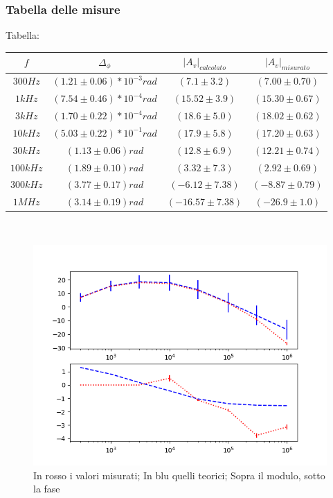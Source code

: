 \documentclass{article}
\begin{document}
\subsubsection{Tabella delle misure}
Tabella:
\\
\begin{table}[]
\centering
\label{my-label}
\renewcommand{\arraystretch}{1.5}
\begin{tabular}{|c|c|c|c|}
\hline $f$ & $\Delta_\phi$ & ${|A_v|}_{calcolato}$ & ${|A_v|}_{misurato}$
\\
\hline $300Hz$ & $(1.21 \pm 0.06)*10^{-3} rad$ & $(7.1 \pm 3.2) $ & $ (7.00 \pm 0.70) $\\
\hline $1kHz$ & $(7.54 \pm 0.46)*10^{-4} rad$ & $(15.52 \pm 3.9)$ & $ (15.30 \pm 0.67) $\\
\hline $3kHz$ & $(1.70 \pm 0.22)*10^{-4} rad$ & $(18.6 \pm 5.0)$ & $ (18.02 \pm 0.62) $\\
\hline $10kHz$ & $(5.03 \pm 0.22)*10^{-1} rad$ & $(17.9 \pm 5.8)$ & $ (17.20 \pm 0.63) $\\
\hline $30kHz$ & $(1.13 \pm 0.06) rad$ & $(12.8 \pm 6.9)$ & $ (12.21 \pm 0.74) $\\
\hline $100kHz$ & $(1.89 \pm 0.10) rad$ & $(3.32 \pm 7.3)$ & $ (2.92 \pm 0.69) $\\
\hline $300kHz$ & $(3.77 \pm 0.17) rad$ & $(-6.12 \pm 7.38)$ & $ (-8.87 \pm 0.79) $\\
\hline $1MHz$ & $(3.14 \pm 0.19) rad$ & $(-16.57 \pm 7.38)$ & $ (-26.9 \pm 1.0) $\\
\hline
\end{tabular}
\\
\end{table}
\begin{figure}
  \includegraphics[width=\textwidth]{Bode.png}
  \caption{In rosso i valori misurati; In blu quelli teorici; Sopra il modulo, sotto la fase}
  \label{fig:bode1}
\end{figure}
\end{document}

